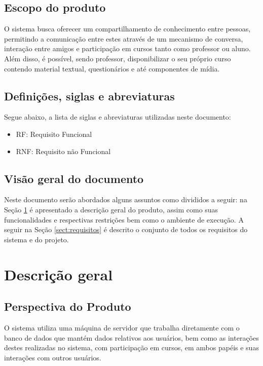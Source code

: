 \documentclass[12pt,a4paper,onecolumn,titlepage]{article}
\begin{document}
\subsection{Escopo do produto}

O sistema busca oferecer um compartilhamento de conhecimento entre pessoas, permitindo a comunicação entre estes através de um mecanismo de conversa, interação entre amigos e participação em cursos tanto como professor ou aluno. Além disso, é possível, sendo professor, disponibilizar o seu próprio curso contendo material textual, questionários e até componentes de mídia.

\subsection{Definições, siglas e abreviaturas}

Segue abaixo, a lista de siglas e abreviaturas utilizadas neste documento:
\begin{itemize}
\item RF: Requisito Funcional
\item RNF: Requisito não Funcional
\end{itemize}

\subsection{Visão geral do documento}

Neste documento serão abordados alguns assuntos como divididos a seguir: na Seção \ref{sect:descricao} é apresentado a descrição geral do produto, assim como suas funcionalidades e respectivas restrições bem como o ambiente de execução. A seguir na Seção \ref{sect:requisitos} é descrito o conjunto de todos os requisitos do sistema e do projeto. %

\section{Descrição geral}
\label{sect:descricao}

\subsection{Perspectiva do Produto}

O sistema utiliza uma máquina de servidor que trabalha diretamente com o banco de dados que mantém dados relativos aos usuários, bem como as interações destes realizadas no sistema, com participação em cursos, em ambos papéis e suas interações com outros usuários.
\end{document}
